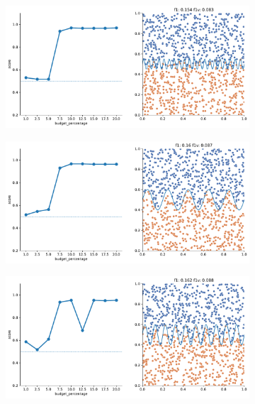 \begin{figure}
\begin{subfigure}{.5\textwidth}
    \end{subfigure}
    \begin{subfigure}{.5\textwidth}
        \centering
        \includegraphics[width=\textwidth]{img/2d_v2/8.pdf}
    \end{subfigure}%
    \hfill
    \begin{subfigure}{.5\textwidth}
        \centering
        \includegraphics[width=\textwidth]{img/2d_v2/12.pdf}
    \end{subfigure}
    \begin{subfigure}{.5\textwidth}
        \centering
        \includegraphics[width=\textwidth]{img/2d_v2/13.pdf}

\end{subfigure}
\end{figure}
